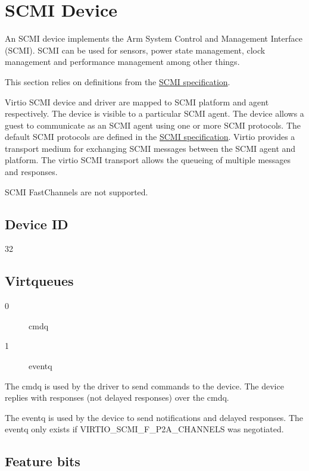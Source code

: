 \section{SCMI Device}\label{sec:Device Types / SCMI Device}

An SCMI device implements the Arm System Control and Management
Interface (SCMI). SCMI can be used for sensors, power state management,
clock management and performance management among other things.

This section relies on definitions from the \hyperref[intro:SCMI]{SCMI
specification}.

Virtio SCMI device and driver are mapped to SCMI platform and agent
respectively. The device is visible to a particular SCMI agent. The
device allows a guest to communicate as an SCMI agent using one or more
SCMI protocols. The default SCMI protocols are defined in the
\hyperref[intro:SCMI]{SCMI specification}. Virtio provides a transport
medium for exchanging SCMI messages between the SCMI agent and platform.
The virtio SCMI transport allows the queueing of multiple messages and
responses.

SCMI FastChannels are not supported.

\subsection{Device ID}\label{sec:Device Types / SCMI Device / Device ID}

32

\subsection{Virtqueues}\label{sec:Device Types / SCMI Device / Virtqueues}

\begin{description}
\item[0] cmdq
\item[1] eventq
\end{description}

The cmdq is used by the driver to send commands to the device. The
device replies with responses (not delayed responses) over the cmdq.

The eventq is used by the device to send notifications and delayed
responses. The eventq only exists if VIRTIO_SCMI_F_P2A_CHANNELS was
negotiated.

\subsection{Feature bits}\label{sec:Device Types / SCMI Device / Feature bits}

